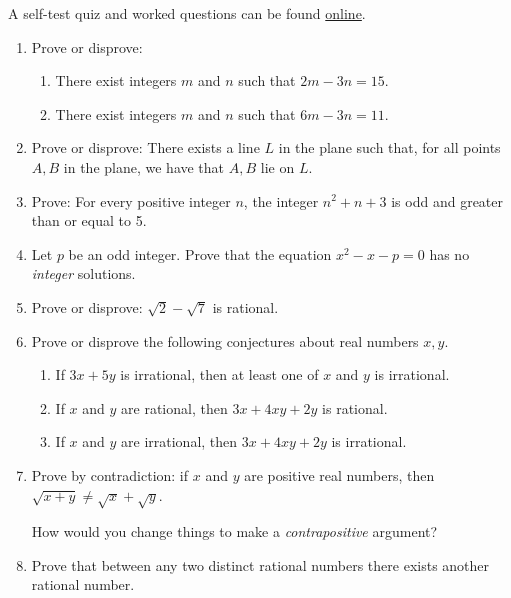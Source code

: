 \begin{exercises}{}{}
	A self-test quiz and worked questions can be found \href{http://www.math.uci.edu/~ndonalds/math13/selftest/2-4-proofs2.html}{online}.

	\begin{enumerate}
		\item Prove or disprove:
		\begin{enumerate}
		  \item There exist integers $m$ and $n$ such that $2m-3n=15$. 
		  
			\item There exist integers $m$ and $n$ such that $6m-3n=11$. 
	  \end{enumerate}
	   
	   
	  \item Prove or disprove: There exists a line $L$ in the plane such that, for all points $A,B$ in the plane, we have that $A,B$ lie on $L$. 
	   
	   
		\item Prove: For every positive integer $n$, the integer $n^2+n+3$ is odd and greater than or equal to 5.
		
	
		\item Let $p$ be an odd integer. Prove that the equation $x^2-x-p=0$ has no \emph{integer} solutions.
		
		
		\item Prove or disprove: $\sqrt 2-\sqrt 7$ is rational.
	   
	   
		\item Prove or disprove the following conjectures about real numbers $x,y$.
		\begin{enumerate}
		  \item If $3x+5y$ is irrational, then at least one of $x$ and $y$ is irrational.
		  
		  \item If $x$ and $y$ are rational, then $3x+4xy+2y$ is rational.
		  
		  \item If $x$ and $y$ are irrational, then $3x+4xy+2y$ is irrational.
		\end{enumerate}
	  
	  
		\item Prove by contradiction: if $x$ and $y$ are positive real numbers, then $\sqrt{x+y}\neq\sqrt{x}+\sqrt{y}$.\par
		How would you change things to make a \emph{contrapositive} argument?
	
	  
		\item Prove that between any two distinct rational numbers there exists another rational number.\label{ex:rationalsdenseinthemselves}
		

\end{enumerate}
\end{exercises}
